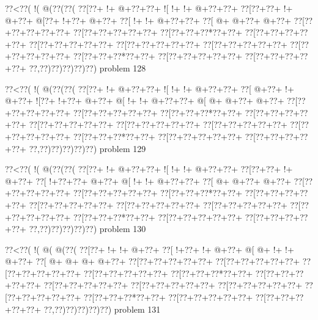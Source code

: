 \vbox{\vbox{\goo
\0??<\0??(\- !(\- @(\0??(\0??(
\0??[\0??+\- !+\- @+\0??+\0??+
\- ![\- !+\- !+\- @+\0??+\0??+
\0??[\0??+\0??+\- !+\- @+\0??+
\- @[\0??+\- !+\0??+\- @+\0??+
\0??[\- !+\- !+\- @+\0??+\0??+
\0??[\- @+\- @+\0??+\- @+\0??+
\0??[\0??+\0??+\0??+\0??+\0??+
\0??[\0??+\0??+\0??+\0??+\0??+
\0??[\0??+\0??+\0??*\0??+\0??+
\0??[\0??+\0??+\0??+\0??+\0??+
\0??[\0??+\0??+\0??+\0??+\0??+
\0??[\0??+\0??+\0??+\0??+\0??+
\0??[\0??+\0??+\0??+\0??+\0??+
\0??[\0??+\0??+\0??+\0??+\0??+
\0??[\0??+\0??+\0??*\0??+\0??+
\0??[\0??+\0??+\0??+\0??+\0??+
\0??[\0??+\0??+\0??+\0??+\0??+
\0??,\0??)\0??)\0??)\0??)\0??)
}
\hfil problem 128\hfil\break
}

\vbox{\vbox{\goo
\0??<\0??(\- !(\- @(\0??(\0??(
\0??[\0??+\- !+\- @+\0??+\0??+
\- ![\- !+\- !+\- @+\0??+\0??+
\0??[\- @+\0??+\- !+\- @+\0??+
\- ![\0??+\- !+\0??+\- @+\0??+
\- @[\- !+\- !+\- @+\0??+\0??+
\- @[\- @+\- @+\0??+\- @+\0??+
\0??[\0??+\0??+\0??+\0??+\0??+
\0??[\0??+\0??+\0??+\0??+\0??+
\0??[\0??+\0??+\0??*\0??+\0??+
\0??[\0??+\0??+\0??+\0??+\0??+
\0??[\0??+\0??+\0??+\0??+\0??+
\0??[\0??+\0??+\0??+\0??+\0??+
\0??[\0??+\0??+\0??+\0??+\0??+
\0??[\0??+\0??+\0??+\0??+\0??+
\0??[\0??+\0??+\0??*\0??+\0??+
\0??[\0??+\0??+\0??+\0??+\0??+
\0??[\0??+\0??+\0??+\0??+\0??+
\0??,\0??)\0??)\0??)\0??)\0??)
}
\hfil problem 129\hfil\break
}

\vbox{\vbox{\goo
\0??<\0??(\- !(\- @(\0??(\0??(
\0??[\0??+\- !+\- @+\0??+\0??+
\- ![\- !+\- !+\- @+\0??+\0??+
\0??[\0??+\0??+\- !+\- @+\0??+
\0??[\- !+\0??+\0??+\- @+\0??+
\- @[\- !+\- !+\- @+\0??+\0??+
\0??[\- @+\- @+\0??+\- @+\0??+
\0??[\0??+\0??+\0??+\0??+\0??+
\0??[\0??+\0??+\0??+\0??+\0??+
\0??[\0??+\0??+\0??*\0??+\0??+
\0??[\0??+\0??+\0??+\0??+\0??+
\0??[\0??+\0??+\0??+\0??+\0??+
\0??[\0??+\0??+\0??+\0??+\0??+
\0??[\0??+\0??+\0??+\0??+\0??+
\0??[\0??+\0??+\0??+\0??+\0??+
\0??[\0??+\0??+\0??*\0??+\0??+
\0??[\0??+\0??+\0??+\0??+\0??+
\0??[\0??+\0??+\0??+\0??+\0??+
\0??,\0??)\0??)\0??)\0??)\0??)
}
\hfil problem 130\hfil\break
}

\vbox{\vbox{\goo
\0??<\0??(\- !(\- @(\- @(\0??(
\0??[\0??+\- !+\- !+\- @+\0??+
\0??[\- !+\0??+\- !+\- @+\0??+
\- @[\- @+\- !+\- !+\- @+\0??+
\0??[\- @+\- @+\- @+\- @+\0??+
\0??[\0??+\0??+\0??+\0??+\0??+
\0??[\0??+\0??+\0??+\0??+\0??+
\0??[\0??+\0??+\0??+\0??+\0??+
\0??[\0??+\0??+\0??+\0??+\0??+
\0??[\0??+\0??+\0??*\0??+\0??+
\0??[\0??+\0??+\0??+\0??+\0??+
\0??[\0??+\0??+\0??+\0??+\0??+
\0??[\0??+\0??+\0??+\0??+\0??+
\0??[\0??+\0??+\0??+\0??+\0??+
\0??[\0??+\0??+\0??+\0??+\0??+
\0??[\0??+\0??+\0??*\0??+\0??+
\0??[\0??+\0??+\0??+\0??+\0??+
\0??[\0??+\0??+\0??+\0??+\0??+
\0??,\0??)\0??)\0??)\0??)\0??)
}
\hfil problem 131\hfil\break
}

